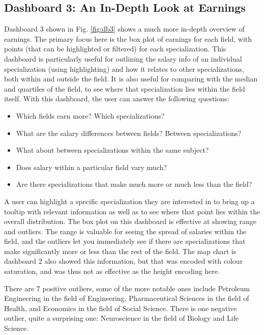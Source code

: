 \documentclass[sigchi]{acmart}
\begin{document}
\subsection{Dashboard 3: An In-Depth Look at Earnings}
\label{sec:db3}

Dashboard 3 shown in Fig. \ref{fig:db3} shows a much more in-depth overview of earnings. The primary focus here is the box plot of earnings for each field, with points (that can be highlighted or filtered) for each specialization. This dashboard is particularly useful for outlining the salary info of an individual specialization (using highlighting) and how it relates to other specializations, both within and outside the field. It is also useful for comparing with the median and quartiles of the field, to see where that specialization lies within the field itself. With this dashboard, the user can answer the following questions:
\begin{itemize}
\item{Which fields earn more? Which specializations?}
\item{What are the salary differences between fields? Between specializations?}
\item{What about between specializations within the same subject?}
\item{Does salary within a particular field vary much?}
\item{Are there specializations that make much more or much less than the field?}
\end{itemize}
A user can highlight a specific specialization they are interested in to bring up a tooltip with relevant information as well as to see where that point lies within the overall distribution. The box plot on this dashboard is effective at showing range and outliers. The range is valuable for seeing the spread of salaries within the field, and the outliers let you immediately see if there are specializations that make significantly more or less than the rest of the field. The map chart is dashboard 2 also showed this information, but that was encoded with colour saturation, and was thus not as effective as the height encoding here.

There are 7 positive outliers, some of the more notable ones include Petroleum Engineering in the field of Engineering, Pharmaceutical Sciences in the field of Health, and Economics in the field of Social Science. There is one negative outlier, quite a surprising one: Neuroscience in the field of Biology and Life Science.
\end{document}
